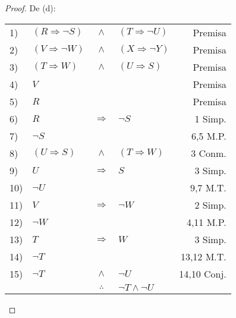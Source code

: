 \documentclass[12pt]{report}
\theoremstyle{largebreak}
\begin{document}
\begin{proof}
        De (d):
        \begin{center}
            \begin{tabular}{l l c l r}
                1) & $(R\Rightarrow\neg S)$ & $\land$ & $(T\Rightarrow\neg U)$ & Premisa \\
                2) & $(V\Rightarrow\neg W)$ & $\land$ & $(X\Rightarrow\neg Y)$ & Premisa \\
                3) & $(T\Rightarrow W)$ & $\land$ & $(U\Rightarrow S)$ & Premisa \\
                4) & $V$ &  &  & Premisa \\
                5) & $R$ &  &  & Premisa \\
                6) & $R$ & $\Rightarrow$ & $\neg S$ & 1 Simp. \\
                7) & $\neg S$ &  &  & 6,5 M.P. \\
                8) & $(U\Rightarrow S)$ & $\land$ & $(T\Rightarrow W)$ & 3 Conm. \\
                9) & $U$ & $\Rightarrow$ & $S$ & 3 Simp. \\
                10) & $\neg U$ &  &  & 9,7 M.T. \\
                11) & $V$ & $\Rightarrow$ & $\neg W$ & 2 Simp. \\
                12) & $\neg W$ &  &  & 4,11 M.P. \\
                13) & $T$ & $\Rightarrow$ & $ W$ & 3 Simp. \\
                14) & $\neg T$ &  &  & 13,12 M.T. \\
                15) & $\neg T$ & $\land$ & $\neg U$ & 14,10 Conj. \\
                \hline
                & & $\therefore$ & $\neg T\land\neg U$ & \\
            \end{tabular}
        \end{center}
    \end{proof}
    
\end{document}
